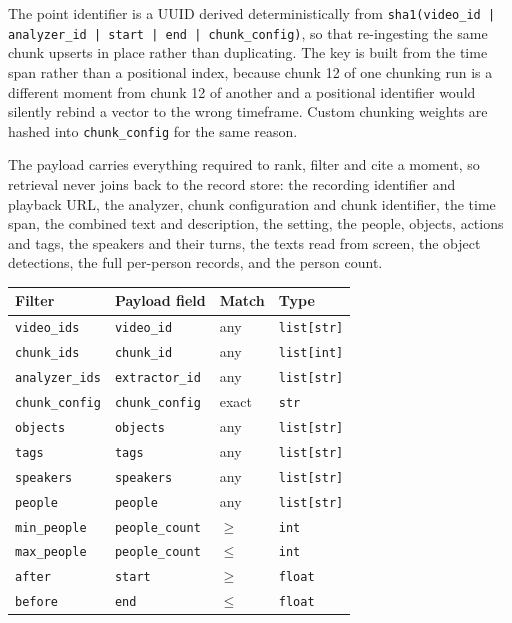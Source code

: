 The point identifier is a UUID derived deterministically from
\texttt{sha1(video\_id\,|\,analyzer\_id\,|\,start\,|\,end\,|\,chunk\_config)}, so that
re-ingesting the same chunk upserts in place rather than duplicating. The key is built
from the time span rather than a positional index, because chunk 12 of one chunking run
is a different moment from chunk 12 of another and a positional identifier would silently
rebind a vector to the wrong timeframe. Custom chunking weights are hashed into
\texttt{chunk\_config} for the same reason.

The payload carries everything required to rank, filter and cite a moment, so retrieval
never joins back to the record store: the recording identifier and playback URL, the
analyzer, chunk configuration and chunk identifier, the time span, the combined text and
description, the setting, the people, objects, actions and tags, the speakers and their
turns, the texts read from screen, the object detections, the full per-person records,
and the person count.

\begin{table}[htbp]
\centering
\small
\begin{tabularx}{\textwidth}{@{}L{2.5cm}L{2.4cm}L{1.9cm}X@{}}
\toprule
\textbf{Filter} & \textbf{Payload field} & \textbf{Match} & \textbf{Type} \\
\midrule
\texttt{video\_ids}    & \texttt{video\_id}     & any   & \texttt{list[str]} \\
\texttt{chunk\_ids}    & \texttt{chunk\_id}     & any   & \texttt{list[int]} \\
\texttt{analyzer\_ids} & \texttt{extractor\_id} & any   & \texttt{list[str]} \\
\texttt{chunk\_config} & \texttt{chunk\_config} & exact & \texttt{str} \\
\texttt{objects}       & \texttt{objects}       & any   & \texttt{list[str]} \\
\texttt{tags}          & \texttt{tags}          & any   & \texttt{list[str]} \\
\texttt{speakers}      & \texttt{speakers}      & any   & \texttt{list[str]} \\
\texttt{people}        & \texttt{people}        & any   & \texttt{list[str]} \\
\texttt{min\_people}   & \texttt{people\_count} & $\geq$ & \texttt{int} \\
\texttt{max\_people}   & \texttt{people\_count} & $\leq$ & \texttt{int} \\
\texttt{after}         & \texttt{start}         & $\geq$ & \texttt{float} \\
\texttt{before}        & \texttt{end}           & $\leq$ & \texttt{float} \\
\bottomrule
\end{tabularx}
\end{table}

